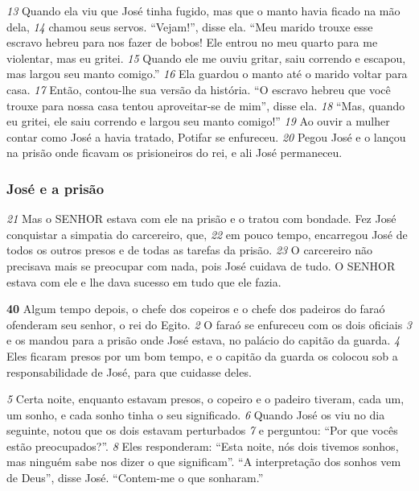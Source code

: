 \bigskip
\textit{\tiny 13}
Quando ela viu que José tinha fugido, mas que o manto havia ficado na mão
dela, 
\textit{\tiny 14}
chamou seus servos. “Vejam!”, disse ela. “Meu marido trouxe esse escravo
hebreu para nos fazer de bobos! Ele entrou no meu quarto para me violentar, mas
eu gritei. 
\textit{\tiny 15}
Quando ele me ouviu gritar, saiu correndo e escapou, mas largou seu
manto comigo.”
\textit{\tiny 16}
Ela guardou o manto até o marido voltar para casa. 
\textit{\tiny 17}
Então, contou-lhe sua
versão da história. “O escravo hebreu que você trouxe para nossa casa tentou
aproveitar-se de mim”, disse ela. 
\textit{\tiny 18}
“Mas, quando eu gritei, ele saiu correndo e
largou seu manto comigo!”
\textit{\tiny 19}
Ao ouvir a mulher contar como José a havia tratado, Potifar se enfureceu.
\textit{\tiny 20}
Pegou José e o lançou na prisão onde ficavam os prisioneiros do rei, e ali José
permaneceu. 

\bigskip
\subsubsection*{José e a prisão}
\textit{\tiny 21}
Mas o SENHOR estava com ele na prisão e o tratou com bondade.
Fez José conquistar a simpatia do carcereiro, que, 
\textit{\tiny 22}
em pouco tempo, encarregou
José de todos os outros presos e de todas as tarefas da prisão. 
\textit{\tiny 23}
O carcereiro não
precisava mais se preocupar com nada, pois José cuidava de tudo. O SENHOR estava
com ele e lhe dava sucesso em tudo que ele fazia.

\bigskip
\textbf{\large 40}
   Algum tempo depois, o chefe dos copeiros e o chefe dos padeiros do faraó
ofenderam seu senhor, o rei do Egito. 
\textit{\tiny 2} 
O faraó se enfureceu com os dois oficiais 
\textit{\tiny 3} 
e os mandou para a prisão onde José estava, no palácio do capitão da guarda. 
\textit{\tiny 4}
Eles ficaram presos por um bom tempo, e o capitão da guarda os colocou sob a
responsabilidade de José, para que cuidasse deles. 

\bigskip
\textit{\tiny 5}
Certa noite, enquanto estavam presos, o copeiro e o padeiro tiveram, cada um,
um sonho, e cada sonho tinha o seu significado. 
\textit{\tiny 6} 
Quando José os viu no dia
seguinte, notou que os dois estavam perturbados 
\textit{\tiny 7}
e perguntou: “Por que vocês
estão preocupados?”. 
\textit{\tiny 8}
Eles responderam: “Esta noite, nós dois tivemos sonhos, mas ninguém sabe
nos dizer o que significam”.
   “A interpretação dos sonhos vem de Deus”, disse José. “Contem-me o que
sonharam.” 

